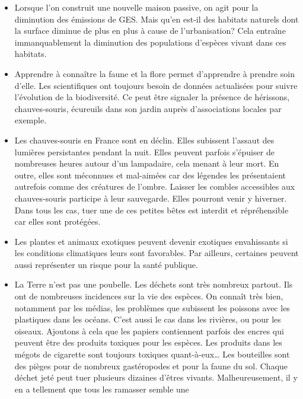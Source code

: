 \begin{itemize}
\tightlist
\item
  Lorsque l'on construit une nouvelle maison passive, on agit pour la
  diminution des émissions de GES. Mais qu'en est-il des habitats
  naturels dont la surface diminue de plus en plus à cause de
  l'urbanisation? Cela entraîne immanquablement la diminution des
  populations d'espèces vivant dans ces habitats.\\
\item
  Apprendre à connaître la faune et la flore permet d'apprendre à
  prendre soin d'elle. Les scientifiques ont toujours besoin de données
  actualisées pour suivre l'évolution de la biodiversité. Ce peut être
  signaler la présence de hérissons, chauves-souris, écureuils dans son
  jardin auprès d'associations locales par exemple.\\
\item
  Les chauves-souris en France sont en déclin. Elles subissent l'assaut
  des lumières persistantes pendant la nuit. Elles peuvent parfois
  s'épuiser de nombreuses heures autour d'un lampadaire, cela menant à
  leur mort. En outre, elles sont méconnues et mal-aimées car des
  légendes les présentaient autrefois comme des créatures de l'ombre.
  Laisser les combles accessibles aux chauves-souris participe à leur
  sauvegarde. Elles pourront venir y hiverner. Dans tous les cas, tuer
  une de ces petites bêtes est interdit et répréhensible car elles sont
  protégées.\\
\item
  Les plantes et animaux exotiques peuvent devenir exotiques
  envahissants si les conditions climatiques leurs sont favorables. Par
  ailleurs, certaines peuvent aussi représenter un risque pour la santé
  publique.\\
\item
  La Terre n'est pas une poubelle. Les déchets sont très nombreux
  partout. Ils ont de nombreuses incidences sur la vie des espèces. On
  connaît très bien, notamment par les médias, les problèmes que
  subissent les poissons avec les plastiques dans les océans. C'est
  aussi le cas dans les rivières, ou pour les oiseaux. Ajoutons à cela
  que les papiers contiennent parfois des encres qui peuvent être des
  produits toxiques pour les espèces. Les produits dans les mégots de
  cigarette sont toujours toxiques quant-à-eux\ldots{} Les bouteilles
  sont des pièges pour de nombreux gastéropodes et pour la faune du sol.
  Chaque déchet jeté peut tuer plusieurs dizaines d'êtres vivants.
  Malheureusement, il y en a tellement que tous les ramasser semble une

\end{itemize}
